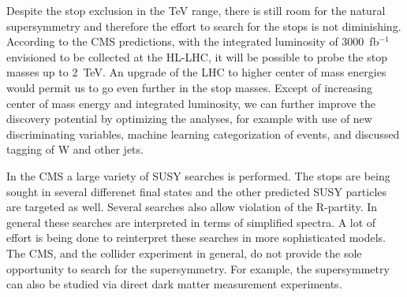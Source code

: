 Despite the stop exclusion in the TeV range, there is still room for the natural supersymmetry and therefore the effort to search for the stops is not diminishing. According to the CMS predictions, with the integrated luminosity of 3000~fb$^{-1}$ envisioned to be collected at the HL-LHC, it will be possible to probe the stop masses up to 2~TeV. An upgrade of the LHC to higher center of mass energies would permit us to go even further in the stop masses. Except of increasing center of mass energy and integrated luminosity, we can further improve the discovery potential by optimizing the analyses, for example with use of new discriminating variables, machine learning categorization of events, and discussed tagging of W and other jets.

In the CMS a large variety of SUSY searches is performed. The stops are being sought in several differenet final states and the other predicted SUSY particles are targeted as well. Several searches also allow violation of the R-partity. In general these searches are interpreted in terms of simplified spectra. A lot of effort is being done to reinterpret these searches in more sophisticated models. The CMS, and the collider experiment in general, do not provide the sole opportunity to search for the supersymmetry. For example, the supersymmetry can also be studied via direct dark matter measurement experiments.

